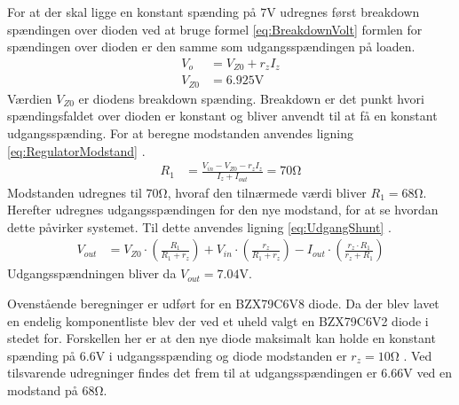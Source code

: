 For at der skal ligge en konstant spænding på $7 \si{\volt}$ udregnes først breakdown spændingen over dioden ved at bruge formel \ref{eq:BreakdownVolt} \cite[Side. 146]{Sedra19uu} formlen for spændingen over dioden er den samme som udgangsspændingen på loaden. 
\begin{align}
	V_o & = V_{Z0} + r_z I_z \label{eq:BreakdownVolt} \\
	V_{Z0} & = 6.925 \si{\volt}
	\end{align}
Værdien $V_{Z0}$ er diodens breakdown spænding.
Breakdown er det punkt hvori spændingsfaldet over dioden er konstant og bliver anvendt til at få en konstant udgangsspænding.
For at beregne modstanden anvendes ligning \ref{eq:RegulatorModstand} \cite[Side. 149]{Sedra19uu}.
\begin{align}
	R_1 & = \frac{V_{in}-V_{Z0}-r_z I_z}{I_z+I_{out}} = 70\si{\ohm} \label{eq:RegulatorModstand}
\end{align}
Modstanden udregnes til $70 \si{\ohm}$, hvoraf den tilnærmede værdi bliver $R_1 = 68 \si{\ohm}$.
Herefter udregnes udgangsspændingen for den nye modstand, for at se hvordan dette påvirker systemet.
Til dette anvendes ligning \ref{eq:UdgangShunt} \cite[Side. 149]{Sedra19uu}.
\begin{align}
	V_{out} & = V_{Z0} \cdot \left( \frac{R_1}{R_1+r_z} \right) + V_{in} \cdot \left( \frac{r_z}{R_1+r_z} \right) - I_{out} \cdot \left( \frac{r_z \cdot R_1}{r_z+R_1} \right) \label{eq:UdgangShunt}
\end{align}
Udgangsspændningen bliver da $V_{out} = 7.04 \si{\volt}$.

Ovenstående beregninger er udført for en BZX79C6V8 diode. 
Da der blev lavet en endelig komponentliste blev der ved et uheld valgt en BZX79C6V2 diode i stedet for. 
Forskellen her er at den nye diode maksimalt kan holde en konstant spænding på $6.6 \si{\volt}$ i udgangsspænding og diode modstanden er $r_z = 10 \si{\ohm}$ \cite[Side. 1 Kolonne 11]{ZenerDiode}.
Ved tilsvarende udregninger findes det frem til at udgangsspændingen er $6.66 \si{\volt}$ ved en modstand på $68 \si{\ohm}$.
